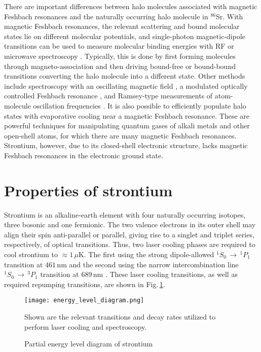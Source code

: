 There are important differences between halo molecules associated with magnetic Feshbach resonances and the naturally occurring halo molecule in $^{86}$Sr. 
With magnetic Feshbach resonances, the relevant scattering and bound molecular states lie on different molecular potentials, and single-photon magnetic-dipole transitions can be used to measure molecular binding energies with RF or microwave spectroscopy \cite{Chin2010,cju05,thw95b}. 
Typically, this is done by first forming molecules through magneto-association and then driving bound-free or bound-bound transitions converting the halo molecule into a different state. 
Other methods include spectroscopy with an oscillating magnetic field \cite{thw95b}, a modulated optically controlled Feshbach resonance \cite{chx15}, and Ramsey-type measurements of atom-molecule oscillation frequencies \cite{ckt03}. 
It is also possible to efficiently populate halo states with evaporative cooling \cite{jba03} near a magnetic Feshbach resonance. 
These are powerful techniques for manipulating quantum gases of alkali metals and other open-shell atoms, for which there are many magnetic Feshbach resonances. 
Strontium, however, due to its closed-shell electronic structure, lacks magnetic Feshbach resonances in the electronic ground state.

\section{Properties of strontium}
\label{sec:sr}
Strontium is an alkaline-earth element with four naturally occurring isotopes, three bosonic and one fermionic.
The two valence electrons in its outer shell may align their spin anti-parallel or parallel, giving rise to a singlet and triplet series, respectively, of optical transitions.
Thus, two laser cooling phases are required to cool strontium to $\approx\!1\,\mu$K.
The first using the strong dipole-allowed $^1S_0\,\rightarrow\,^1P_1$ transition at $461$\,nm and the second using the narrow intercombination line $^1S_0\,\rightarrow\,^3P_1$ transition at $689$\,nm \cite{Katori1999,Ido2000,Mukaiyama2003a,Loftus2004,Ciuryo2004,Nagel2005a,Mickelson2005}.
These laser cooling transitions, as well as required repumping transitions, are shown in Fig.\,\ref{fig:energyLevels}.
	\begin{figure} 
		\centerline{
		\texttt{[image: energy\_level\_diagram.png]}}
		\caption{Partial energy level diagram of strontium}{Shown are the relevant transitions and decay rates utilized to perform laser cooling and spectroscopy.}
		\label{fig:energyLevels}
	\end{figure}
	
